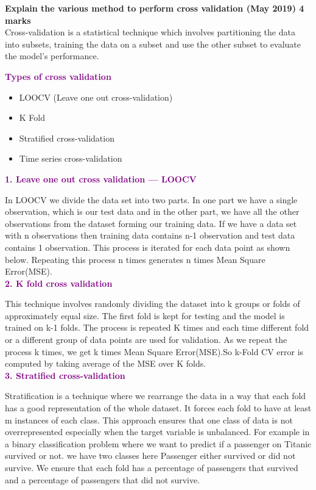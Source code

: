 
\textbf{\textcolor{LightMagenta}{Explain the various method to perform cross validation (May 2019) \hfill 4 marks}}
\\[5pt]

Cross-validation is a statistical technique which involves partitioning the data into subsets, training the data on a subset and use the other subset to evaluate the model’s performance. 

\textbf{\textcolor{purple}{Types of cross validation}}
\begin{itemize}
    \item LOOCV (Leave one out cross-validation)
    \item K Fold
    \item Stratified cross-validation
    \item Time series cross-validation
\end{itemize}

\textbf{\textcolor{purple}{1. Leave one out cross validation — LOOCV} }

In LOOCV we divide the data set into two parts. In one part we have a single observation, which is our test data and in the other part, we have all the other observations from the dataset forming our training data.
If we have a data set with n observations then training data contains n-1 observation and test data contains 1 observation.
This process is iterated for each data point as shown below. Repeating this process n times generates n times Mean Square Error(MSE).
\\

\textbf{\textcolor{purple}{2. K fold cross validation}}

This technique involves randomly dividing the dataset into k groups or folds of approximately equal size. The first fold is kept for testing and the model is trained on k-1 folds.
The process is repeated K times and each time different fold or a different group of data points are used for validation.
As we repeat the process k times, we get k times Mean Square Error(MSE).So k-Fold CV error is computed by taking average of the MSE over K folds.
\\

\textbf{\textcolor{purple}{3. Stratified cross-validation}}

Stratification is a technique where we rearrange the data in a way that each fold has a good representation of the whole dataset. It forces each fold to have at least m instances of each class. This approach ensures that one class of data is not overrepresented especially when the target variable is unbalanced.
For example in a binary classification problem where we want to predict if a passenger on Titanic survived or not. we have two classes here Passenger either survived or did not survive. We ensure that each fold has a percentage of passengers that survived and a percentage of passengers that did not survive.
\\

